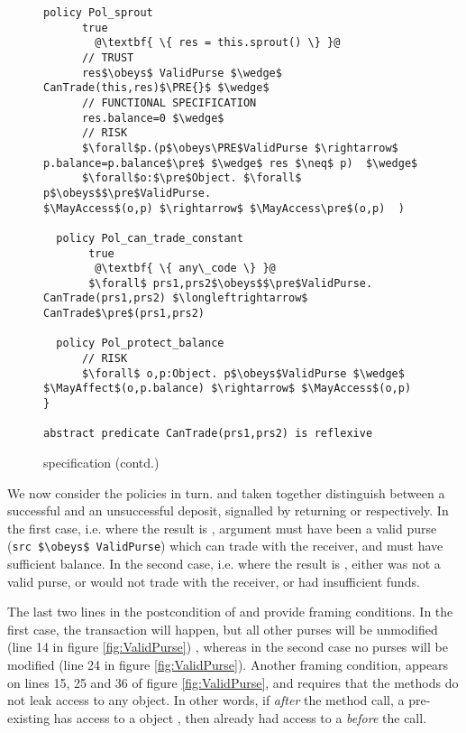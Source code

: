 \begin{figure*}[htb]
\begin{lstlisting}[escapechar=@,firstnumber=27]
  policy Pol_sprout
      true
        @\textbf{ \{ res = this.sprout() \} }@
      // TRUST
      res$\obeys$ ValidPurse $\wedge$  CanTrade(this,res)$\PRE{}$ $\wedge$
      // FUNCTIONAL SPECIFICATION
      res.balance=0 $\wedge$
      // RISK
      $\forall$p.(p$\obeys\PRE$ValidPurse $\rightarrow$                                       p.balance=p.balance$\pre$ $\wedge$ res $\neq$ p)  $\wedge$
      $\forall$o:$\pre$Object. $\forall$ p$\obeys$$\pre$ValidPurse.                           $\MayAccess$(o,p) $\rightarrow$ $\MayAccess\pre$(o,p)  )

  policy Pol_can_trade_constant
       true
        @\textbf{ \{ any\_code \} }@
       $\forall$ prs1,prs2$\obeys$$\pre$ValidPurse.                                  CanTrade(prs1,prs2) $\longleftrightarrow$ CanTrade$\pre$(prs1,prs2)

  policy Pol_protect_balance
      // RISK
      $\forall$ o,p:Object. p$\obeys$ValidPurse $\wedge$                               $\MayAffect$(o,p.balance) $\rightarrow$ $\MayAccess$(o,p)
}

abstract predicate CanTrade(prs1,prs2) is reflexive
\end{lstlisting}
\vspace*{-7mm}
\caption{ specification (contd.)}
\end{figure*}


We now consider the policies in turn.
  and  taken together  distinguish between
a successful and an unsuccessful deposit, signalled by
returning  or  respectively. In the first case, i.e. 
where the result is ,
argument   must have been
a valid purse
%
(\lstinline+src $\obeys$ ValidPurse+)
%
which can trade with the receiver,
 and  must have sufficient balance. In the second case, i.e. 
where the result is ,
 either  was not a valid purse,
or would not trade with the receiver, or had insufficient
funds.

The last two lines in the postcondition of  and
 provide framing conditions.  In the first case,
the transaction will happen, but all other purses will be unmodified
(line 14 in figure \ref{fig:ValidPurse}) , whereas in the second case
no purses will be modified (line 24 in figure \ref{fig:ValidPurse}).
Another framing condition, appears on lines 15, 25 and 36 of figure
\ref{fig:ValidPurse}, and requires that the methods do not leak access
to  any  object. In other
words, if \textit{after} the method call, a pre-existing  has
access to a  object , then  already had
access to a  \textit{before} the call.

